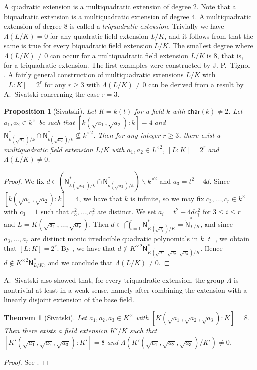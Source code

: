 \documentclass[twoside,11pt]{amsart}
\numberwithin{equation}{section}
\newtheorem{thm}[equation]{Theorem}
\newtheorem{prop}[equation]{Proposition}
\theoremstyle{definition}
\newcommand\N{\operatorname{N}}
\newcommand{\car}{\mathsf{char}}
\newcommand{\mg}[1]{{#1}^{\times}}
\newcommand{\sq}[1]{{#1}^{\times 2}}
\renewcommand{\leq}{\leqslant}
\renewcommand{\geq}{\geqslant}
\renewcommand{\N}{\mathsf{N}}
\renewcommand{\setminus}{\smallsetminus}
\renewcommand{\leq}{\leqslant}
\renewcommand{\geq}{\geqslant}
\renewcommand{\setminus}{\smallsetminus}
\begin{document}
A quadratic  extension is a multiquadratic extension of degree $2$. 
Note that a biquadratic extension is a multiquadratic extension of degree $4$.
A multiquadratic extension of degree $8$ is called a \emph{triquadratic extension}.
Trivially we have $\Lambda(L/K)=0$ for any quadratic field extension $L/K$, and it follows from  that the same is true for every biquadratic field extension $L/K$.
The smallest degree where $\Lambda(L/K)\neq 0$ can occur for a multiquadratic field extension $L/K$ is $8$, that is, for a triquadratic extension.
The first examples were constructed by J.-P.~Tignol \cite{Tig81}.
A fairly general construction of multiquadratic extensions $L/K$ with $[L:K]=2^r$ for any $r\geq 3$ with $\Lambda(L/K)\neq 0$ can be derived from a result by A.~Sivatski \cite{Siv10} concerning the case $r=3$.

\begin{prop}[Sivatski]\label{Tignol-Sivatski-multiquad-nontriv}
    Let $K=k(t)$ for a field $k$ with $\car(k)\neq 2$.
    Let $a_1,a_2\in\mg{k}$ be such that $[k(\sqrt{a_1},\sqrt{a_2}):k]=4$ and $\N_{k(\sqrt{a_1})/k}^\ast\cap \N_{k(\sqrt{a_2})/k}^\ast\not\subseteq\sq{k}$. Then for any integer $r\geq 3$, there exist a multiquadratic field extension $L/K$ with $a_1,a_2\in\sq{L}$, $[L:K]=2^r$ and $\Lambda(L/K)\neq 0$.
\end{prop}
\begin{proof}
    We fix $d\in(\N_{k(\sqrt{a_1})/k}^\ast\cap \N_{k(\sqrt{a_2})/k}^\ast)\setminus\sq{k}$ and $a_3=t^2-4d$. 
    Since $[k(\sqrt{a_1},\sqrt{a_2}):k]=4$, we have that $k$ is infinite, so we may fix $c_3,\dots,c_r\in\mg{k}$ with $c_3=1$ such that $c_3^2,\dots,c_r^2$ are distinct.
    We set $a_i=t^2-4dc_i^2$ for $3\leq i\leq r$ and $L=K(\sqrt{a_1},\dots,\sqrt{a_r})$.
    Then $d\in\bigcap_{i=1}^r\N^\ast_{K(\sqrt{a_i})/K}=\widetilde{\N}^\ast_{L/K}$, and 
    since $a_3,\dots,a_r$ are distinct monic irreducible quadratic polynomials in $k[t]$, we 
    obtain that $[L:K]=2^r$.
    By \cite[Cor.~10]{Siv10}, we have that 
    $d\notin \sq{K}\N^\ast_{K(\sqrt{a_1},\sqrt{a_2},\sqrt{a_3})/K}$.
    Hence $d\notin \sq{K}\N^\ast_{L/K}$, and
    we conclude that $\Lambda(L/K)\neq 0$.
\end{proof}

A.~Sivatski also showed that, for every triquadratic extension, the group $\Lambda$ is nontrivial at least in a weak sense, namely after combining the extension with a linearly disjoint extension of the base field.

\begin{thm}[Sivatski]\label{Sivatski-triquatshift}
Let $a_1,a_2,a_3\in\mg{K}$ with $[K(\sqrt{a_1},\sqrt{a_2},\sqrt{a_3}):K]=8$. 
Then there exists a field extension $K'/K$ such that 
$[K'(\sqrt{a_1},\sqrt{a_2},\sqrt{a_3}):K']=8$ and $\Lambda(K'(\sqrt{a_1},\sqrt{a_2},\sqrt{a_3})/K')\neq 0$.
\end{thm}
\begin{proof}
    See \cite[Theorem 5.5]{Siv18}.
\end{proof}
\end{document}
